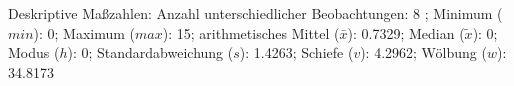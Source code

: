                     \begin{noten}
                	    \note{} Deskriptive Maßzahlen:
                	    Anzahl unterschiedlicher Beobachtungen: 8%
                	    ; 
                	      Minimum ($min$): 0; 
                	      Maximum ($max$): 15; 
                	      arithmetisches Mittel ($\bar{x}$): \num[round-mode=places,round-precision=2]{0.7329}; 
                	      Median ($\tilde{x}$): 0; 
                	      Modus ($h$): 0; 
                	      Standardabweichung ($s$): \num[round-mode=places,round-precision=2]{1.4263}; 
                	      Schiefe ($v$): \num[round-mode=places,round-precision=2]{4.2962}; 
                	      Wölbung ($w$): \num[round-mode=places,round-precision=2]{34.8173}
                     \end{noten}

